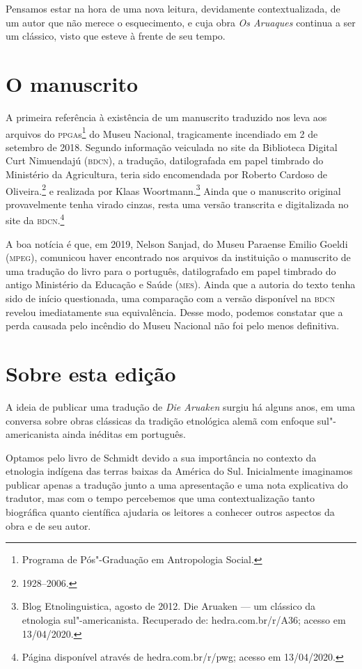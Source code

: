 Pensamos estar na hora de uma nova leitura, devidamente contextualizada, de um autor que não merece o esquecimento, e cuja obra \textit{Os Aruaques} continua a ser um clássico, visto que esteve à frente de seu tempo.

\section{O manuscrito}

A primeira referência à existência de um manuscrito traduzido nos leva aos arquivos do \textsc{ppga}s\footnote{Programa de Pós"-Graduação em Antropologia Social.} do Museu Nacional, 
tragicamente incendiado em 2 de setembro de 2018. Segundo informação veiculada no site da Biblioteca Digital Curt Nimuendajú (\textsc{bdcn}), a tradução, datilografada em papel timbrado do Ministério da Agricultura, teria sido encomendada por Roberto Cardoso de Oliveira.\footnote{1928--2006.} e realizada por Klaas Woortmann.\footnote{Blog Etnolinguistica, agosto de 2012. Die Aruaken --- um clássico da etnologia sul"-americanista. Recuperado de: hedra.com.br/r/A36; acesso em 13/04/2020.} Ainda que o manuscrito original provavelmente tenha virado cinzas, resta uma versão transcrita e digitalizada no site da \textsc{bdcn}.\footnote{Página disponível através de hedra.com.br/r/pwg; acesso em 13/04/2020.} 

A boa notícia é que, em 2019, Nelson Sanjad, do Museu Paraense Emilio Goeldi (\textsc{mpeg}), comunicou haver encontrado nos arquivos da instituição o manuscrito de uma tradução do livro para o português, datilografado em papel timbrado do antigo Ministério da Educação e Saúde (\textsc{mes}). Ainda que a autoria do texto tenha sido de início questionada, uma comparação com a versão disponível na \textsc{bdcn} revelou imediatamente sua equivalência. Desse modo, podemos constatar que a perda causada pelo incêndio do Museu Nacional não foi pelo menos definitiva.

\section{Sobre esta edição}

A ideia de publicar uma tradução de \textit{Die Aruaken} surgiu há alguns anos, em uma conversa sobre obras clássicas da tradição etnológica alemã com enfoque sul"-americanista ainda inéditas em português. 

Optamos pelo livro de Schmidt devido a sua importância no contexto da etnologia indígena das terras baixas da América do Sul. Inicialmente imaginamos publicar apenas a tradução junto a uma apresentação e uma nota explicativa do tradutor, mas com o tempo percebemos que uma contextualização tanto biográfica quanto científica ajudaria os leitores a conhecer outros aspectos da obra e de seu autor.


